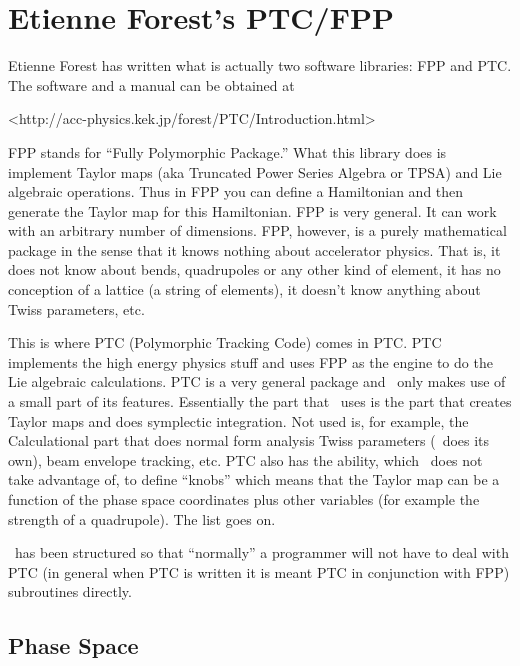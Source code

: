 \chapter{Etienne Forest's PTC/FPP}
\label{c:etienne}

Etienne Forest\cite{b:forest} has written what is actually two
software libraries: FPP and PTC. The software and a manual can be
obtained at
\begin{example} 
  <http://acc-physics.kek.jp/forest/PTC/Introduction.html>    
\end{example}

FPP stands for ``Fully Polymorphic Package.'' What this library does
is implement Taylor maps (aka Truncated Power Series Algebra or TPSA)
and Lie algebraic operations. Thus in FPP you can define a Hamiltonian
and then generate the Taylor map for this Hamiltonian. FPP is very
general. It can work with an arbitrary number of dimensions.  FPP,
however, is a purely mathematical package in the sense that it knows
nothing about accelerator physics. That is, it does not know about
bends, quadrupoles or any other kind of element, it has no conception
of a lattice (a string of elements), it doesn't know anything about
Twiss parameters, etc.

This is where PTC (Polymorphic Tracking Code) comes in PTC. PTC
implements the high energy physics stuff and uses FPP as the engine to
do the Lie algebraic calculations.  PTC is a very general package and
\bmad\ only makes use of a small part of its features. Essentially
the part that \bmad\ uses is the part that creates Taylor maps and
does symplectic integration. Not used is, for example, the
Calculational part that does normal form analysis Twiss parameters
(\bmad\ does its own), beam envelope tracking, etc. PTC also has the
ability, which \bmad\ does not take advantage of, to define ``knobs''
which means that the Taylor map can be a function of the phase space
coordinates plus other variables (for example the strength of a
quadrupole). The list goes on. 

\bmad\ has been structured so that ``normally'' a programmer will not have
to deal with PTC (in general when PTC is written it is meant PTC in
conjunction with FPP) subroutines directly. 

\section{Phase Space}
\label{s:etienne.space}

